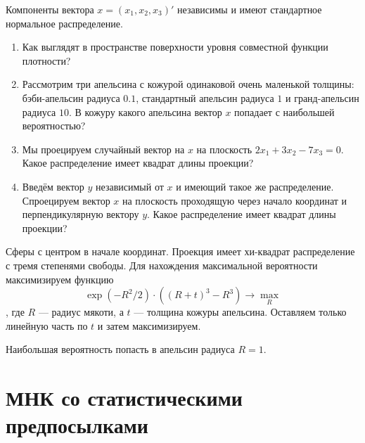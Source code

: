 \begin{problem}
Компоненты вектора $x=(x_1, x_2, x_3)'$ независимы и имеют стандартное нормальное распределение.

\begin{enumerate}
\item Как выглядят в пространстве поверхности уровня совместной функции плотности?
\item Рассмотрим три апельсина с кожурой одинаковой очень маленькой толщины: бэби-апельсин радиуса $0.1$, стандартный апельсин радиуса $1$ и гранд-апельсин радиуса $10$. В кожуру какого апельсина вектор $x$ попадает с наибольшей вероятностью?
\item Мы проецируем случайный вектор на $x$ на плоскость $2x_1 + 3x_2 - 7x_3 = 0$. Какое распределение имеет квадрат длины проекции?
\item Введём вектор $y$ независимый от $x$ и имеющий такое же распределение. Спроецируем вектор $x$ на плоскость проходящую через начало координат и перпендикулярную вектору $y$.  Какое распределение имеет квадрат длины проекции?
\end{enumerate}


\begin{sol}
Сферы с центром в начале координат. Проекция имеет хи-квадрат распределение с тремя степенями свободы.
Для нахождения максимальной вероятности максимизируем функцию
\[
\exp(-R^2/2) \cdot ((R+t)^3 - R^3) \to \max_R
\],
где $R$ — радиус мякоти, а $t$ — толщина кожуры апельсина. Оставляем только линейную часть по $t$ и затем максимизируем.

Наибольшая вероятность попасть в апельсин радиуса $R=1$.
\end{sol}
\end{problem}


\section{МНК со статистическими предпосылками}


